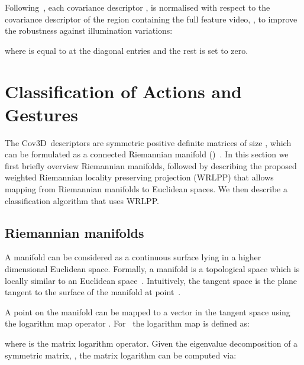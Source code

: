 \documentclass[10pt,twocolumn,letterpaper]{article}
\newcommand{\eqsize}{\footnotesize}
\newcommand{\cov}{{Cov3D}}
\begin{document}
Following~\cite{TuzelEtAl2008}, each covariance descriptor {\eqsize },
is normalised with respect to the covariance descriptor of the region containing the full feature video, {\eqsize },
to improve the robustness against illumination variations:


\noindent
\eqsize

\normalsize

\noindent
where {\small } is equal to {\small } at the diagonal entries and the rest is set to zero.
\section{Classification of Actions and Gestures}
\label{sec:method}

The \cov~descriptors are symmetric positive definite matrices of size \mbox{\eqsize },
which can be formulated as a connected Riemannian manifold ({\eqsize })~\cite{harandi_eccv_2012}.
In this section we first briefly overview Riemannian manifolds,
followed by describing the proposed weighted Riemannian locality preserving projection (WRLPP)
that allows mapping from Riemannian manifolds to Euclidean spaces.
We then describe a classification algorithm that uses WRLPP.



\subsection{Riemannian manifolds}
\label{sec:manifolds}

A manifold can be considered as a continuous surface lying in a higher dimensional Euclidean space.
Formally, a manifold is a topological space which is locally similar to an Euclidean space~\cite{TuzelEtAl2008}.
Intuitively, the tangent space {\eqsize } is the plane tangent to the surface of the manifold at point~{\eqsize }.

A point {\eqsize } on the manifold can be mapped to a vector in the tangent space {\eqsize }
using the logarithm map operator {\eqsize }.
For~{\eqsize } the logarithm map is defined as:

\vspace{-1ex}
\eqsize

\normalsize

\noindent
where {\eqsize } is the matrix logarithm operator.
Given the eigenvalue decomposition of a symmetric matrix,
\mbox{\eqsize },
the matrix logarithm can be computed via:

\vspace{-1ex}
\eqsize
\end{document}
